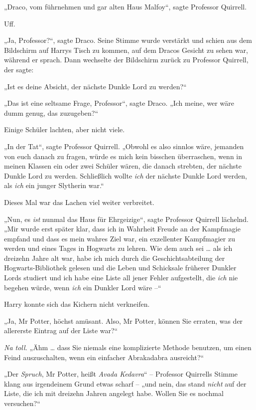 {„Draco, vom führnehmen und gar alten Haus Malfoy“, sagte Professor Quirrell.

Uff.

„Ja, Professor?“, sagte Draco. Seine Stimme wurde verstärkt und schien aus dem Bildschirm auf Harrys Tisch zu kommen, auf dem Dracos Gesicht zu sehen war, während er sprach. Dann wechselte der Bildschirm zurück zu Professor Quirrell, der sagte:

„Ist es deine Absicht, der nächste Dunkle Lord zu werden?“

„Das ist eine seltsame Frage, Professor“, sagte Draco. „Ich meine, wer wäre dumm genug, das zuzugeben?“

Einige Schüler lachten, aber nicht viele.

„In der Tat“, sagte Professor Quirrell. „Obwohl es also sinnlos wäre, jemanden von euch danach zu fragen, würde es mich kein bisschen überraschen, wenn in meinen Klassen ein oder zwei Schüler wären, die danach strebten, der nächste Dunkle Lord zu werden. Schließlich wollte \emph{ich} der nächste Dunkle Lord werden, als \emph{ich} ein junger Slytherin war.“

Dieses Mal war das Lachen viel weiter verbreitet.

„Nun, es \emph{ist} nunmal das Haus für Ehrgeizige“, sagte Professor Quirrell lächelnd. „Mir wurde erst später klar, dass ich in Wahrheit Freude an der Kampfmagie empfand und dass es mein wahres Ziel war, ein exzellenter Kampfmagier zu werden und eines Tages in Hogwarts zu lehren. Wie dem auch sei … als ich dreizehn Jahre alt war, habe ich mich durch die Geschichtsabteilung der Hogwarts-Bibliothek gelesen und die Leben und Schicksale früherer Dunkler Lords studiert und ich habe eine Liste all jener Fehler aufgestellt, die \emph{ich} nie begehen würde, wenn \emph{ich} ein Dunkler Lord wäre --“

Harry konnte sich das Kichern nicht verkneifen.

„Ja, Mr Potter, höchst amüsant. Also, Mr Potter, können Sie erraten, was der allererste Eintrag auf der Liste war?“

\emph{Na toll.} „Ähm … dass Sie niemals eine komplizierte Methode benutzen, um einen Feind auszuschalten, wenn ein einfacher Abrakadabra ausreicht?“

„Der \emph{Spruch}, Mr Potter, heißt \emph{Avada Kedavra}“ -- Professor Quirrells Stimme klang aus irgendeinem Grund etwas scharf -- „und nein, das stand \emph{nicht} auf der Liste, die ich mit dreizehn Jahren angelegt habe. Wollen Sie es nochmal versuchen?“

}
